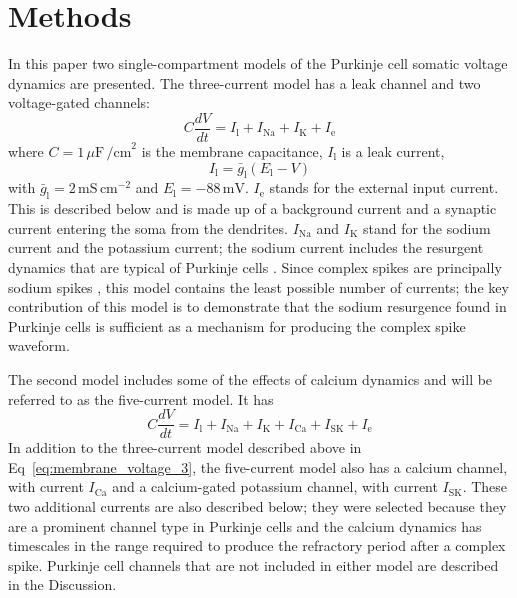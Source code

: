 \documentclass[twocolumn]{svjour3}          %
\newcommand{\mv}{\,\mathrm{mV}}
\newcommand{\msi}{\,\mathrm{mS\,cm^{-2}}}
\renewcommand{\k}{\mathrm{K}}
\newcommand{\ca}{\mathrm{Ca}}
\newcommand{\na}{\mathrm{Na}}
\newcommand{\sk}{\mathrm{SK}}
\newcommand{\leak}{\mathrm{l}}
\begin{document}
\section{Methods}



In this paper two single-compartment models of the Purkinje cell
somatic voltage dynamics are presented. The three-current model has a
leak channel and two voltage-gated channels:
\begin{equation}
\label{eq:membrane_voltage_3}
C\frac{dV}{dt} =I_\leak+I_{\na}+I_\k+I_{\mathrm{e}}
\end{equation}
where $C = 1\,\mu\mathrm{F}\,\mathrm{\slash cm}^{2}$ is the membrane capacitance,
$I_{\leak}$ is a leak current,
\begin{equation}
\label{eq:I_L}
I_{\leak} =\bar{g}_{\leak}(E_\leak-V)
\end{equation}
with $\bar{g}_{\leak} = 2\msi$ and
$E_{\leak}=-88\mv$. $I_{\mathrm{e}}$ stands for the external input
current. This is described below and is made up of a background
current and a synaptic current entering the soma from the
dendrites. $I_{\na}$ and $I_{\k}$ stand for the sodium current and the
potassium current; the sodium current includes the resurgent dynamics
that are typical of Purkinje cells
\citep{RamanBean1997,RamanBean2001,KhaliqEtAl2003,KhaliqRaman2006}. Since
complex spikes are principally sodium spikes
\citep{StuartHausser1994}, this model contains the least possible
number of currents; the key contribution of this model is to
demonstrate that the sodium resurgence found in Purkinje cells is
sufficient as a mechanism for producing the complex spike waveform.

The second model includes some of the effects of calcium dynamics and
will be referred to as the five-current model. It has
\begin{equation}
\label{eq:membrane_voltage_5}
C\frac{dV}{dt} =I_{\leak}+I_{\na}+I_\k+I_\ca+I_\sk+I_{\mathrm{e}}
\end{equation}
In addition to the three-current model described above in
Eq~\ref{eq:membrane_voltage_3}, the five-current model also has a
calcium channel, with current $I_\ca$ and a calcium-gated potassium
channel, with current $I_\sk$. These two additional currents are also
described below; they were selected because they are a prominent
channel type in Purkinje cells and the calcium dynamics has timescales
in the range required to produce the refractory period after a complex
spike. Purkinje cell channels that are not included in either model
are described in the Discussion.
\end{document}
